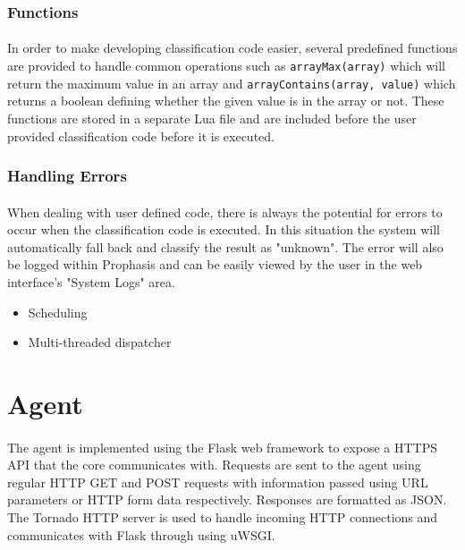 \documentclass[bsc,logo,twoside,singlespacing]{infthesis}
\begin{document}
\subsubsection{Functions}
\paragraph*{}
	In order to make developing classification code easier, several predefined
	functions are provided to handle common operations such as
	\texttt{arrayMax(array)} which will return the maximum value in an array and
	\texttt{arrayContains(array, value)} which returns a boolean defining whether
	the given value is in the array or not.  These functions are stored in a
	separate Lua file and are included before the user provided classification code
	before it is executed.

\subsubsection{Handling Errors}
\paragraph*{}
	When dealing with user defined code, there is always the potential for errors
	to occur when the classification code is executed.  In this situation the
	system will automatically fall back and classify the result as "unknown". The
	error will also be logged within Prophasis and can be easily viewed by the user
	in the web interface's "System Logs" area.

\begin{itemize}
	\item Scheduling
	\item Multi-threaded dispatcher
\end{itemize}

\section{Agent}
\paragraph*{}
	The agent is implemented using the Flask web framework to expose a HTTPS API
	that the core communicates with.  Requests are sent to the agent using regular
	HTTP GET and POST requests with information passed using URL parameters or HTTP
	form data respectively.  Responses are formatted as JSON.  The Tornado HTTP
	server is used to handle incoming HTTP connections and communicates with Flask
	through using uWSGI.
\end{document}
